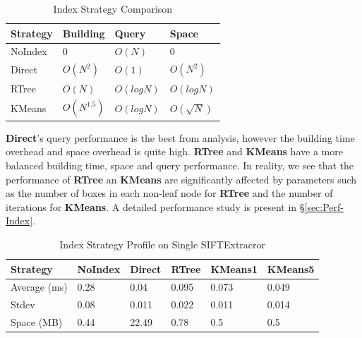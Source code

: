 \documentclass{sig-alternate}
\begin{document}
\begin{table}[ht]
\begin{center}
    \caption{Index Strategy Comparison}
    \begin{scriptsize}
    \begin{tabular}{ | p{1.75cm} | p{1.75cm} | p{1.75cm} | p{1.75cm} |}
    \hline
    Strategy & Building & Query & Space \\ \hline \hline
    NoIndex & 0 & $O(N)$ & 0 \\ \hline
    Direct & $O(N^2)$ & $O(1)$ & $O(N^2)$ \\ \hline
    RTree & $O(N)$ & $O(logN)$ & $O(logN)$ \\ \hline
    KMeans & $O(N^{1.5})$ & $O(logN)$ & $O(\sqrt{N})$ \\ \hline
    \end{tabular}
    \end{scriptsize}
    \label{tb:index-comparison}
\end{center}   
\end{table}

{\bf Direct}'s query performance is the best from analysis, however the building time overhead and space overhead is quite high.
{\bf RTree} and {\bf KMeans} have a more balanced building time, space and query performance.
In reality, we see that the performance of {\bf RTree} an {\bf KMeans} are significantly affected by parameters such as the
number of boxes in each non-leaf node for {\bf RTree} and the number of iterations for {\bf KMeans}.
A detailed performance study is present in \S\ref{sec:Perf-Index}.

\begin{table}[ht]
\begin{center}
    \caption{Index Strategy Profile on Single SIFTExtracror}
    \begin{scriptsize}
    \begin{tabular}{ | p{1.7cm} | p{0.9cm} | p{0.8cm} | p{0.9cm} | p{1cm} | p{1cm} |}
    \hline
    Strategy & NoIndex & Direct & RTree & KMeans1 & KMeans5 \\ \hline \hline
    Average (ms) & 0.28 & 0.04 & 0.095 & 0.073 & 0.049 \\ \hline
    Stdev & 0.08 & 0.011 & 0.022 & 0.011 & 0.014 \\ \hline
    Space (MB) & 0.44 & 22.49 & 0.78 & 0.5 & 0.5 \\ \hline
    \end{tabular}
    \end{scriptsize}
    \label{tb:single-SIFT-query}
\end{center}   
\end{table}
\end{document}
